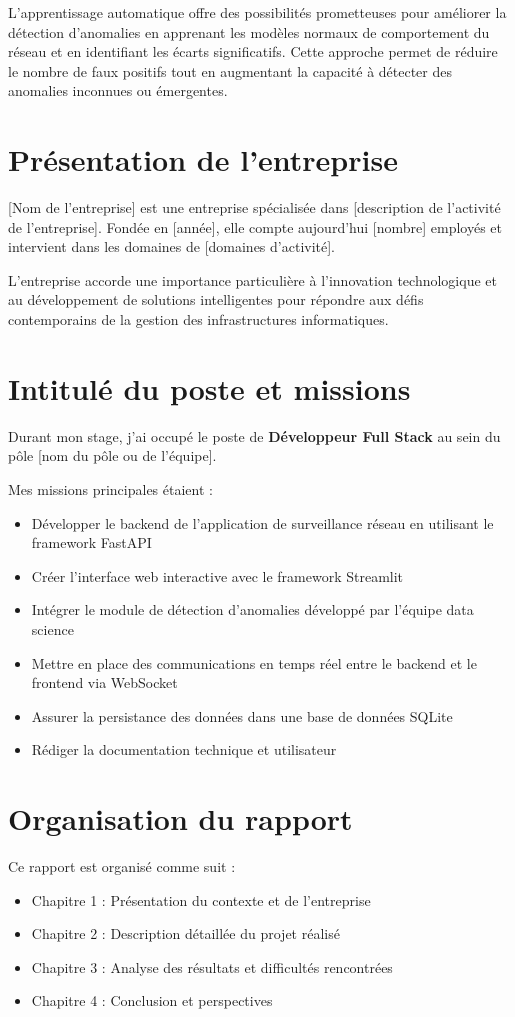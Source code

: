 \documentclass[12pt,a4paper]{report}
\begin{document}
L'apprentissage automatique offre des possibilités prometteuses pour améliorer la détection d'anomalies en apprenant les modèles normaux de comportement du réseau et en identifiant les écarts significatifs. Cette approche permet de réduire le nombre de faux positifs tout en augmentant la capacité à détecter des anomalies inconnues ou émergentes.

\section{Présentation de l'entreprise}
[Nom de l'entreprise] est une entreprise spécialisée dans [description de l'activité de l'entreprise]. Fondée en [année], elle compte aujourd'hui [nombre] employés et intervient dans les domaines de [domaines d'activité].

L'entreprise accorde une importance particulière à l'innovation technologique et au développement de solutions intelligentes pour répondre aux défis contemporains de la gestion des infrastructures informatiques.

\section{Intitulé du poste et missions}
Durant mon stage, j'ai occupé le poste de \textbf{Développeur Full Stack} au sein du pôle [nom du pôle ou de l'équipe].

Mes missions principales étaient :
\begin{itemize}
    \item Développer le backend de l'application de surveillance réseau en utilisant le framework FastAPI
    \item Créer l'interface web interactive avec le framework Streamlit
    \item Intégrer le module de détection d'anomalies développé par l'équipe data science
    \item Mettre en place des communications en temps réel entre le backend et le frontend via WebSocket
    \item Assurer la persistance des données dans une base de données SQLite
    \item Rédiger la documentation technique et utilisateur
\end{itemize}

\section{Organisation du rapport}
Ce rapport est organisé comme suit :
\begin{itemize}
    \item Chapitre 1 : Présentation du contexte et de l'entreprise
    \item Chapitre 2 : Description détaillée du projet réalisé
    \item Chapitre 3 : Analyse des résultats et difficultés rencontrées
    \item Chapitre 4 : Conclusion et perspectives
\end{itemize}
\end{document}
